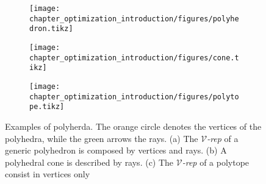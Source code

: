 \begin{figure}[t]
\centering
    \begin{subfigure}[b]{0.35\textwidth}
        \centering
        \texttt{[image: chapter\_optimization\_introduction/figures/polyhedron.tikz]}
        \caption{}
        \label{fig:polyhedron}
    \end{subfigure}
     \begin{subfigure}[b]{0.15\textwidth}
        \centering
        \texttt{[image: chapter\_optimization\_introduction/figures/cone.tikz]}
        \caption{}
        \label{fig:cone}
    \end{subfigure}    
    \hfill
    \begin{subfigure}[b]{0.35\textwidth}
        \centering
        \texttt{[image: chapter\_optimization\_introduction/figures/polytope.tikz]}
        \caption{}
        \label{fig:polytope}
    \end{subfigure}
	\caption[Examples of polyhedra]{Examples of polyherda. The orange circle denotes the vertices of the polyhedra, while the green arrows the rays. (a) The $\mathcal{V}$\emph{-rep} of a generic polyhedron is composed by vertices and rays. (b) A polyhedral cone is described by rays. (c) The $\mathcal{V}$\emph{-rep} of a polytope consist in vertices only}
	\label{fig:polyhedron-polytope}
\end{figure}
